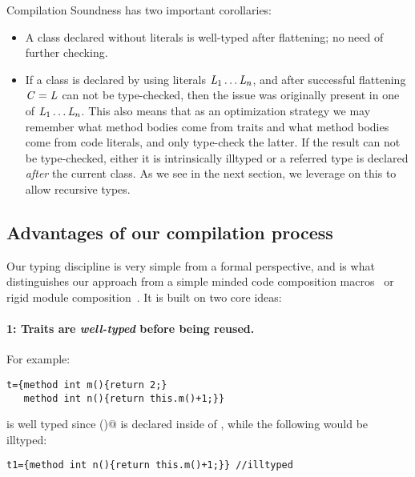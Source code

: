 \noindent Compilation Soundness has two important corollaries:
\begin{itemize}
\item A class declared without literals
is well-typed after flattening; no need of further checking.
\item If a class is declared by using literals $\mathit{L}_1\ldots\mathit{L}_n$, and after successful flattening $\mathit{C} = \mathit{L}$ can not be type-checked,
then the issue was originally present in one of $\mathit{L}_1\ldots\mathit{L}_n$.
This also means that as an optimization strategy
 we may remember what method bodies come from traits and what method bodies come from code literals, and only type-check the latter.
If the result can not be type-checked, either it is intrinsically illtyped or a 
referred type is declared \emph{after} the current class. 
As we see in the next section, we leverage on this 
to allow recursive types.
 \end{itemize}






\subsection{Advantages of our compilation process}


Our typing discipline is very simple from a formal perspective,  
and is what distinguishes our approach from a simple minded code composition macros~\cite{bawden1999quasiquotation}
or rigid module composition~\cite{ancona_zucca_2002}. 
It is built on two core ideas:

\paragraph{1: Traits are \emph{well-typed} before being reused.}
 For example:
\begin{lstlisting}
t={method int m(){return 2;} 
   method int n(){return this.m()+1;}}
\end{lstlisting}
\Q@t@ is well typed since \Q@m()@ is declared inside of \Q@t@, while the following would be illtyped:
\begin{lstlisting}
t1={method int n(){return this.m()+1;}} //illtyped
\end{lstlisting}


